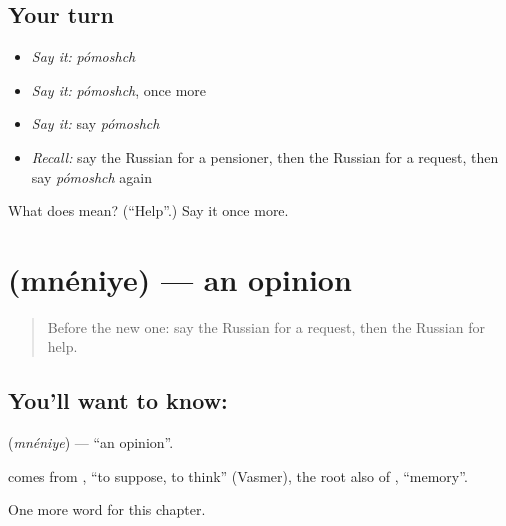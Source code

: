 \subsection*{Your turn}
\begin{itemize}
\raggedright
  \item \emph{Say it:} \emph{pómoshch}
  \item \emph{Say it:} \emph{pómoshch}, once more
  \item \emph{Say it:} say \emph{pómoshch}
  \item \emph{Recall:} say the Russian for a pensioner, then the Russian for a request, then say \emph{pómoshch} again
\end{itemize}

\begin{tcolorbox}[breakable,colback=teal!4,colframe=teal!35!black,title={Before you move on}]
What does  mean? (\textquotedblleft{}Help\textquotedblright{}.) Say it once more.
\end{tcolorbox}
\section[\texorpdfstring{\ru{мнение} (mnéniye)}{мнение (mnéniye)}]{ (mnéniye) — an opinion}

\label{lesson:RU-C169-mneniye}



\begin{quote}
Before the new one: say the Russian for a request, then the Russian for help.
\end{quote}

\subsection*{You'll want to know: }
\textbf{} (\emph{mnéniye}) — \textquotedblleft{}an opinion\textquotedblright{}.

\begin{cousinweb}
\textbf{} comes from \emph{}, \textquotedblleft{}to suppose, to think\textquotedblright{} (Vasmer), the root also of \emph{}, \textquotedblleft{}memory\textquotedblright{}.
\end{cousinweb}

\begin{grammarlens}[title={What you've built}]
One more word for this chapter.
\end{grammarlens}


